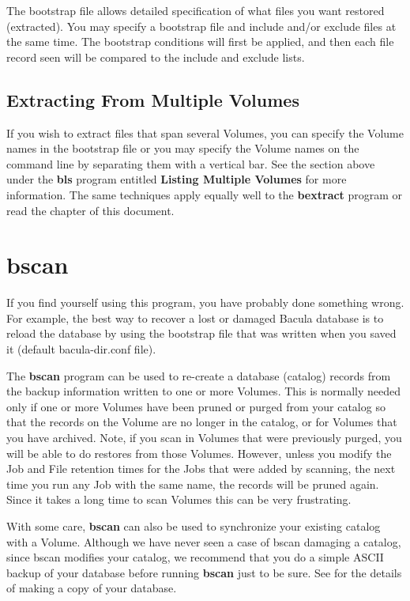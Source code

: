 The bootstrap file allows detailed specification of what files you want
restored (extracted). You may specify a bootstrap file and include and/or
exclude files at the same time. The bootstrap conditions will first be
applied, and then each file record seen will be compared to the include and
exclude lists. 

\subsection{Extracting From Multiple Volumes}

If you wish to extract files that span several Volumes, you can specify the
Volume names in the bootstrap file or you may specify the Volume names on the
command line by separating them with a vertical bar. See the section above
under the {\bf bls} program entitled {\bf Listing Multiple Volumes} for more
information. The same techniques apply equally well to the {\bf bextract}
program or read the 
chapter of this document.

\section{bscan}
\label{bscan}

If you find yourself using this program, you have probably done something
wrong. For example, the best way to recover a lost or damaged Bacula
database is to reload the database by using the bootstrap file that
was written when you saved it (default bacula-dir.conf file).

The {\bf bscan} program can be used to re-create a database (catalog)
records from the backup information written to one or more Volumes.  This
is normally needed only if one or more Volumes have been pruned or purged
from your catalog so that the records on the Volume are no longer in the
catalog, or for Volumes that you have archived.  Note, if you scan in
Volumes that were previously purged, you will be able to do restores from
those Volumes.  However, unless you modify the Job and File retention times
for the Jobs that were added by scanning, the next time you run any Job
with the same name, the records will be pruned again.  Since it takes a
long time to scan Volumes this can be very frustrating.

With some care, {\bf bscan} can also be used to synchronize your existing
catalog with a Volume.  Although we have never seen a case of bscan
damaging a catalog, since bscan modifies your catalog, we recommend that
you do a simple ASCII backup of your database before running {\bf bscan}
just to be sure.  See  for
the details of making a copy of your database.

